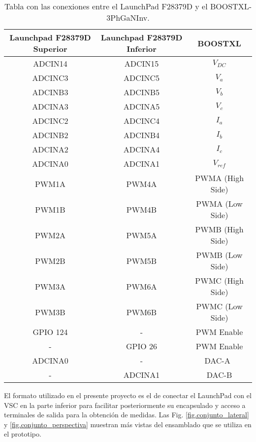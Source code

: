 \documentclass{report}
\begin{document}
\begin{table}[!h]
    \begin{center}
    \begin{tabulary}{10cm}{|C|C|C|} \hline\hline\hline
    \textbf{Launchpad F28379D Superior} &  \textbf{Launchpad F28379D Inferior} &  \textbf{BOOSTXL}  \\ \hline
    ADCIN14 & ADCIN15 & $V_{DC}$ \\ \hline
    ADCINC3 & ADCINC5 & $V_{a}$ \\ \hline
    ADCINB3 & ADCINB5 & $V_{b}$ \\ \hline
    ADCINA3 & ADCINA5 & $V_{c}$ \\ \hline
    ADCINC2 & ADCINC4 & $I_{a}$ \\ \hline 
    ADCINB2 & ADCINB4 & $I_{b}$ \\ \hline
    ADCINA2 & ADCINA4 & $I_{c}$ \\ \hline
    ADCINA0 & ADCINA1 & $V_{ref}$ \\ \hline
    PWM1A & PWM4A & PWMA (High Side) \\ \hline
    PWM1B & PWM4B & PWMA (Low Side) \\ \hline
    PWM2A & PWM5A & PWMB (High Side) \\ \hline
    PWM2B & PWM5B & PWMB (Low Side) \\ \hline
    PWM3A & PWM6A & PWMC (High Side) \\ \hline
    PWM3B & PWM6B & PWMC (Low Side) \\ \hline
    GPIO 124 & - & PWM Enable \\ \hline
   - &  GPIO 26 & PWM Enable \\ \hline
    ADCINA0 & - & DAC-A  \\ \hline
    - & ADCINA1 & DAC-B \\ \hline
    \end{tabulary}
    \end{center}
    
    \caption{Tabla con las conexiones entre el LaunchPad F28379D y el BOOSTXL-3PhGaNInv.} \label{tab.conexioneslaunchpadinversor}
    \end{table}
    
El formato utilizado en el presente proyecto es el de conectar el LaunchPad con el VSC en la parte inferior para facilitar posteriormente su encapsulado y acceso a terminales de salida para la obtención de medidas.
Las Fig. \ref{fig.conjunto_lateral} y \ref{fig.conjunto_perspectiva} muestran más vistas del ensamblado que se utiliza en el prototipo.
\end{document}
